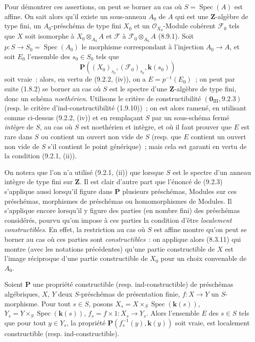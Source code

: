 Pour démontrer ces assertions, on peut se borner au cas où
$S=\operatorname{Spec}(A)$ est affine. On sait alors qu'il existe un
sous-anneau $A_0$ de $A$ qui est une $\mathbf Z$-algèbre de type fini, un
$A_0$-préschéma de type fini $X_0$ et un $\mathcal O_{X_0}$-Module cohérent
$\mathcal F_0$ tels que $X$ soit isomorphe à $X_0\otimes_{A_0}A$ et
$\mathcal F$ à $\mathcal F_0\otimes_{A_0}A$ (8.9.1). Soit
$p:S\to S_0=\operatorname{Spec}(A_0)$ le morphisme correspondant à
l'injection $A_0\to A$, et soit $E_0$ l'ensemble des $s_0\in S_0$ tels que
\[
\boldsymbol{P}((X_0)_{s_0},(\mathcal F_0)_{s_0},\boldsymbol{k}(s_0))
\]
soit vraie~; alors, en vertu de (9.2.2, (iv)), on a $E=p^{-1}(E_0)$~; on peut
par suite (1.8.2) se borner au cas où $S$ est le spectre d'une
$\mathbf Z$-algèbre de type fini, donc un schéma \emph{noethérien}. Utilisons le
critère de constructibilité $(\mathbf 0_{\mathrm{III}},9.2.3)$ (resp. le
critère d'ind-constructibilité (1.9.10))~; on est alors ramené, en utilisant
comme ci-dessus (9.2.2, (iv)) et en remplaçant $S$ par un sous-schéma fermé
\emph{intègre} de $S$, au cas où $S$ est noethérien et intègre, et où il faut prouver
que $E$ est rare dans $S$ ou contient un ouvert non vide de $S$ (resp. que $E$
contient un ouvert non vide de $S$ s'il contient le point générique)~; mais
cela est garanti en vertu de la condition (9.2.1, (ii)).

On notera que l'on n'a utilisé (9.2.1, (ii)) que lorsque $S$ est le spectre
d'un anneau intègre de type fini sur $\mathbf Z$. Il est clair d'autre part
que l'énoncé de (9.2.3) s'applique aussi lorsqu'il figure dans $\boldsymbol{P}$
plusieurs préschémas, Modules sur ces préschémas, morphismes de préschémas ou
homomorphismes de Modules. Il s'applique encore lorsqu'il y figure des parties
(en nombre fini) des préschémas considérés, pourvu qu'on impose à ces parties
la condition d'être \emph{localement constructibles}. En effet, la restriction
au cas où $S$ est affine montre qu'on peut se borner au cas où ces parties sont
\emph{constructibles}~: on applique alors (8.3.11) qui montre (avec les
notations précédentes) qu'une partie constructible de $X$ est l'image
réciproque d'une partie constructible de $X_0$ pour un choix convenable de
$A_0$.

\begin{corollary}[9.2.4]
\label{IV.9.2.4-fr}
Soient $\boldsymbol{P}$ une propriété constructible (\textup{resp.} ind-constructible) de
préschémas algébriques, $X$, $Y$ deux $S$-préschémas de présentation finie,
$f:X\to Y$ un $S$-morphisme. Pour tout $s\in S$, posons
$X_s=X\times_S\operatorname{Spec}(\boldsymbol{k}(s))$,
$Y_s=Y\times_S\operatorname{Spec}(\boldsymbol{k}(s))$,
$f_s=f\times1:X_s\to Y_s$. Alors l'ensemble $E$ des $s\in S$ tels que pour
tout $y\in Y_s$, la propriété $\boldsymbol{P}(f_s^{-1}(y),\boldsymbol{k}(y))$ soit vraie, est
localement constructible (\textup{resp.} ind-constructible).
\end{corollary}

